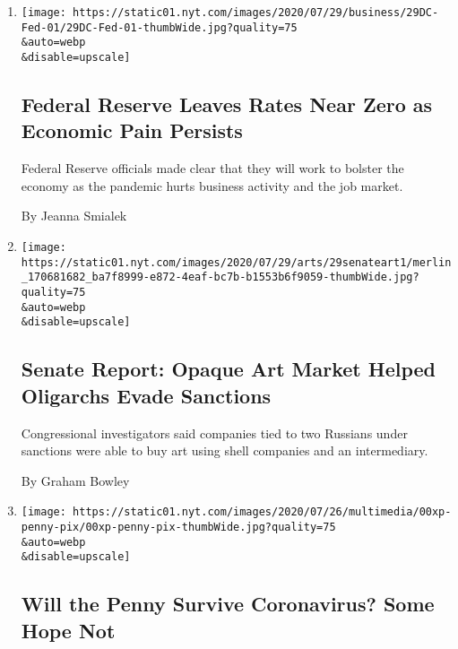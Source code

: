 \begin{enumerate}
\def\labelenumi{\arabic{enumi}.}
\item
  \href{/2020/07/29/business/economy/federal-reserve-meeting-interest-rates.html}{}

  \texttt{[image: https://static01.nyt.com/images/2020/07/29/business/29DC-Fed-01/29DC-Fed-01-thumbWide.jpg?quality=75\\\&auto=webp\\\&disable=upscale]}

  \hypertarget{federal-reserve-leaves-rates-near-zero-as-economic-pain-persists}{%
  \subsection{Federal Reserve Leaves Rates Near Zero as Economic Pain
  Persists}\label{federal-reserve-leaves-rates-near-zero-as-economic-pain-persists}}

  Federal Reserve officials made clear that they will work to bolster
  the economy as the pandemic hurts business activity and the job
  market.

  By Jeanna Smialek
\item
  \href{/2020/07/29/arts/design/senate-report-art-market-russia-oligarchs-sanctions.html}{}

  \texttt{[image: https://static01.nyt.com/images/2020/07/29/arts/29senateart1/merlin\_170681682\_ba7f8999-e872-4eaf-bc7b-b1553b6f9059-thumbWide.jpg?quality=75\\\&auto=webp\\\&disable=upscale]}

  \hypertarget{senate-report-opaque-art-market-helped-oligarchs-evade-sanctions}{%
  \subsection{Senate Report: Opaque Art Market Helped Oligarchs Evade
  Sanctions}\label{senate-report-opaque-art-market-helped-oligarchs-evade-sanctions}}

  Congressional investigators said companies tied to two Russians under
  sanctions were able to buy art using shell companies and an
  intermediary.

  By Graham Bowley
\item
  \href{/2020/07/29/business/coin-shortage-penny.html}{}

  \texttt{[image: https://static01.nyt.com/images/2020/07/26/multimedia/00xp-penny-pix/00xp-penny-pix-thumbWide.jpg?quality=75\\\&auto=webp\\\&disable=upscale]}

  \hypertarget{will-the-penny-survive-coronavirus-some-hope-not}{%
  \subsection{Will the Penny Survive Coronavirus? Some Hope
  Not}\label{will-the-penny-survive-coronavirus-some-hope-not}}


\end{enumerate}
